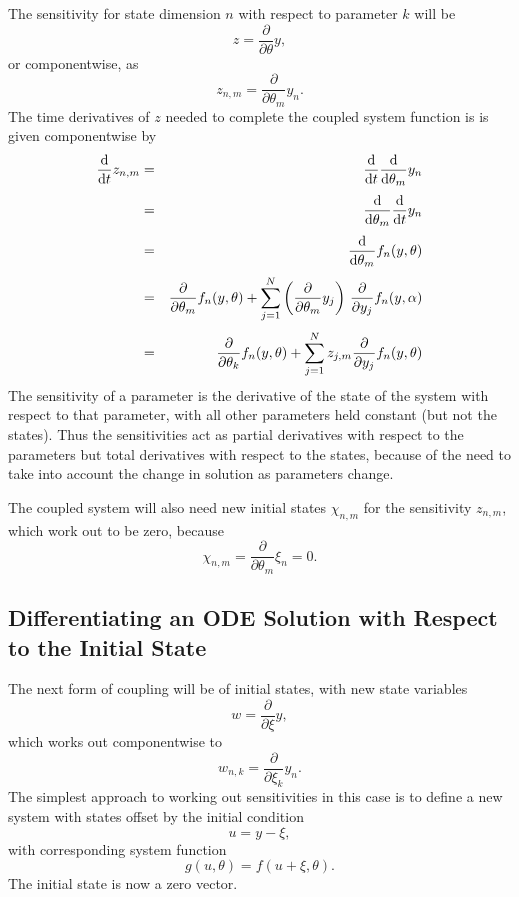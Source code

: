 \documentclass[10pt]{article}
\begin{document}
The sensitivity for state dimension $n$ with respect to parameter $k$
will be
\[
z = \frac{\partial}{\partial \theta} y,
\]
or componentwise, as
\[
z_{n,m} = \frac{\partial}{\partial \theta_m} y_n.
\]
%
The time derivatives of $z$ needed to complete the coupled system
function is is given componentwise by
%
\begin{eqnarray*}
\frac{\mbox{d}}{\mbox{d} t} z_{n,m}
& = &
\frac{\mbox{d}}{\mbox{d} t} \frac{\mbox{d}}{\mbox{d} \theta_m} y_n
\\[3pt]
& = &
\frac{\mbox{d}}{\mbox{d} \theta_m} \frac{\mbox{d}}{\mbox{d} t} y_n
\\[3pt]
& = & 
\frac{\mbox{d}}{\mbox{d} \theta_m} f_n(y,\theta)
\\[3pt]
& = & 
\frac{\partial}{\partial \theta_m} f_n(y,\theta)
+ \sum_{j = 1}^N \left( \frac{\partial}{\partial \theta_m} y_j \right) \, 
         \frac{\partial}{\partial y_j} f_n(y,\alpha)
\\[3pt]
& = & 
\frac{\partial}{\partial \theta_k} f_n(y,\theta)
+ \sum_{j=1}^N z_{j,m} \frac{\partial}{\partial y_j} f_n(y,\theta)
\end{eqnarray*}
%
The sensitivity of a parameter is the derivative of the state of the
system with respect to that parameter, with all other parameters held
constant (but not the states).  Thus the sensitivities act as partial
derivatives with respect to the parameters but total derivatives with
respect to the states, because of the need to take into account the
change in solution as parameters change.

The coupled system will also need new initial states $\chi_{n,m}$ for
the sensitivity $z_{n,m}$, which work out to be zero, because
\[
\chi_{n,m} = \frac{\partial}{\partial \theta_m} \xi_n = 0.
\]

\subsection{Differentiating an ODE Solution with Respect to the Initial State}

The next form of coupling will be of initial states, with new state
variables
\[
w = \frac{\partial}{\partial \xi} y,
\]
which works out componentwise to
\[
w_{n,k} = \frac{\partial}{\partial \xi_{k}} y_n.
\]
The simplest approach to working out sensitivities in this case is to
define a new system with states offset by the initial condition
\[
u = y - \xi,
\]
with corresponding system function
\[
g(u,\theta) = f(u + \xi, \theta).
\]
The initial state is now a zero vector.
\end{document}
